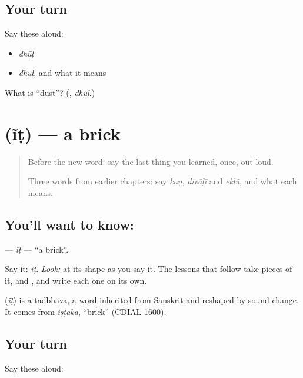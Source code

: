 \subsection*{Your turn}
Say these aloud:

\begin{itemize}
\raggedright
  \item \emph{dhūḷ}
  \item \emph{dhūḷ}, and what it means
\end{itemize}

\begin{tcolorbox}[breakable,colback=teal!4,colframe=teal!35!black,title={Before you move on}]
What is \textquotedblleft{}dust\textquotedblright{}? (\textbf{}, \emph{dhūḷ}.)
\end{tcolorbox}
\section[\texorpdfstring{\gu{ઈંટ} (ĩṭ)}{ઈંટ (ĩṭ)}]{ (ĩṭ) — a brick}

\label{lesson:GU-C07-int}



\begin{quote}
Before the new word: say the last thing you learned, once, out loud.

Three words from earlier chapters: say \emph{kaṇ}, \emph{divāḷī} and \emph{eklũ}, and what each means.
\end{quote}

\subsection*{You'll want to know: }
\textbf{} — \emph{ĩṭ} — \textquotedblleft{}a brick\textquotedblright{}.

Say it: \emph{ĩṭ}. \emph{Look:} at its shape as you say it. The lessons that follow take pieces of it, \textbf{} and \textbf{}, and write each one on its own.

\begin{cousinweb}
\textbf{} (\emph{ĩṭ}) is a tadbhava, a word inherited from Sanskrit and reshaped by sound change. It comes from \emph{iṣṭakā}, \textquotedblleft{}brick\textquotedblright{} (CDIAL 1600).
\end{cousinweb}

\subsection*{Your turn}
Say these aloud:

